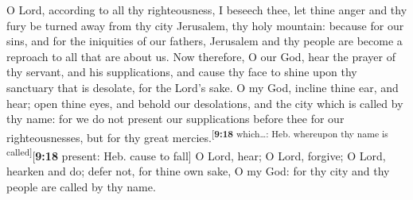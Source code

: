  O Lord, according to all thy righteousness, I beseech
thee, let thine anger and thy fury be turned away from thy city
Jerusalem, thy holy mountain: because for our sins, and for the
iniquities of our fathers, Jerusalem and thy people are become a
reproach to all that are about us.  Now therefore, O our
God, hear the prayer of thy servant, and his supplications, and cause
thy face to shine upon thy sanctuary that is desolate, for the Lord's
sake.  O my God, incline thine ear, and hear; open thine
eyes, and behold our desolations, and the city which is called by thy
name: for we do not present our supplications before thee for our
righteousnesses, but for thy great
mercies.\textsuperscript{{[}\textbf{9:18} which\ldots: Heb. whereupon
thy name is called{]}}{[}\textbf{9:18} present: Heb. cause to fall{]}
 O Lord, hear; O Lord, forgive; O Lord, hearken and do;
defer not, for thine own sake, O my God: for thy city and thy people are
called by thy name.

